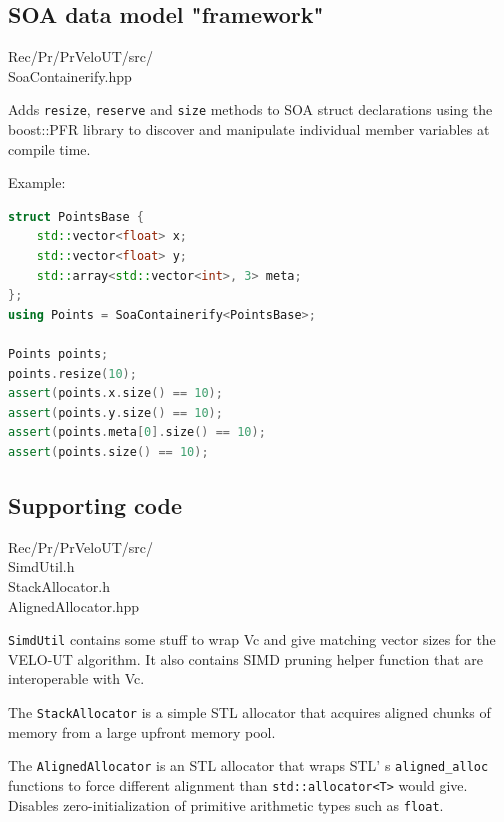 \documentclass[12pt]{article}
\newcommand\tab[1][.7cm]{\hspace*{#1}}
\newcommand{\code}[1]{\texttt{#1}}
\begin{document}
\newpage
\subsection{SOA data model "framework"}

\begin{itshape}
    Rec/Pr/PrVeloUT/src/\\
    \tab SoaContainerify.hpp
\end{itshape}

\vspace{1pc}

Adds \code{resize}, \code{reserve} and \code{size} methods to SOA struct declarations using the boost::PFR library to discover and manipulate individual member variables at compile time.

Example:
\begin{lstlisting}[language=C++]
struct PointsBase {
    std::vector<float> x;
    std::vector<float> y;
    std::array<std::vector<int>, 3> meta;
};
using Points = SoaContainerify<PointsBase>;

Points points;
points.resize(10);
assert(points.x.size() == 10);
assert(points.y.size() == 10);
assert(points.meta[0].size() == 10);
assert(points.size() == 10);
\end{lstlisting}


\subsection{Supporting code}

\begin{itshape}
    Rec/Pr/PrVeloUT/src/\\
    \tab SimdUtil.h\\
    \tab StackAllocator.h\\
    \tab AlignedAllocator.hpp
\end{itshape}

\vspace{1pc}

\code{SimdUtil} contains some stuff to wrap Vc and give matching vector sizes for the VELO-UT algorithm. It also contains SIMD pruning helper function that are interoperable with Vc.

The \code{StackAllocator} is a simple STL allocator that acquires aligned chunks of memory from a large upfront memory pool.

The \code{AlignedAllocator} is an STL allocator that wraps STL'
s \code{aligned\_alloc} functions to force different alignment than 
\code{std::allocator\textless T\textgreater} would give. 
Disables zero-initialization of primitive arithmetic types such as \code{float}.
\end{document}
